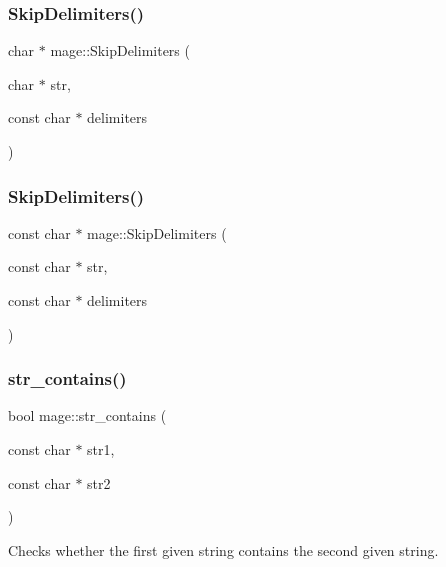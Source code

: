 \subsubsection{\texorpdfstring{Skip\+Delimiters()}{SkipDelimiters()}\hspace{0.1cm}{\footnotesize\ttfamily [1/2]}}
{\footnotesize\ttfamily char $\ast$ mage\+::\+Skip\+Delimiters (\begin{DoxyParamCaption}\item[{char $\ast$}]{str,  }\item[{const char $\ast$}]{delimiters }\end{DoxyParamCaption})}

\hypertarget{namespacemage_acd903800f144d88982aa559730b9a165}{}\label{namespacemage_acd903800f144d88982aa559730b9a165} 
\subsubsection{\texorpdfstring{Skip\+Delimiters()}{SkipDelimiters()}\hspace{0.1cm}{\footnotesize\ttfamily [2/2]}}
{\footnotesize\ttfamily const char $\ast$ mage\+::\+Skip\+Delimiters (\begin{DoxyParamCaption}\item[{const char $\ast$}]{str,  }\item[{const char $\ast$}]{delimiters }\end{DoxyParamCaption})}

\hypertarget{namespacemage_a5194c40ccd591a8a8926ad7812abcd09}{}\label{namespacemage_a5194c40ccd591a8a8926ad7812abcd09} 
\subsubsection{\texorpdfstring{str\+\_\+contains()}{str\_contains()}\hspace{0.1cm}{\footnotesize\ttfamily [1/4]}}
{\footnotesize\ttfamily bool mage\+::str\+\_\+contains (\begin{DoxyParamCaption}\item[{const char $\ast$}]{str1,  }\item[{const char $\ast$}]{str2 }\end{DoxyParamCaption})}

Checks whether the first given string contains the second given string.


